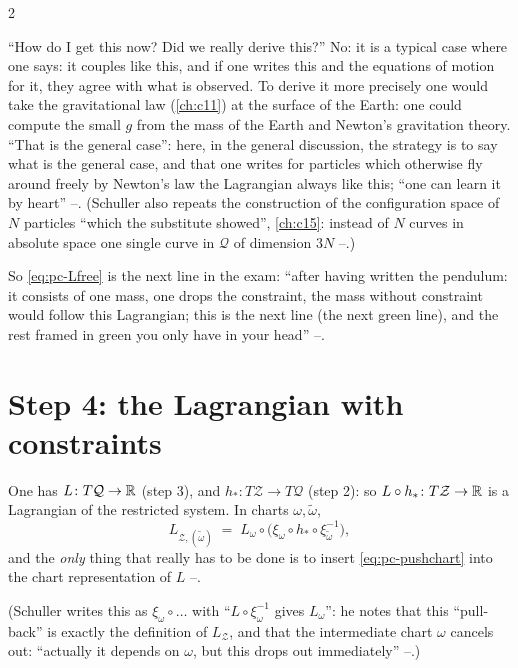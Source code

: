 \begin{paracol}{2}
\begin{coursenote}[Where does $V=mgq^3$ come from? (as said in class)]\label{cn:pc-mgh}
``How do I get this now? Did we really derive this?'' No: it is a typical case where one says: it couples like this, and if one writes this and the equations of motion for it, they agree with what is observed. To derive it more precisely one would take the gravitational law (\cref{ch:c11}) at the surface of the Earth: one could compute the small $g$ from the mass of the Earth and Newton's gravitation theory. ``That is the general case'': here, in the general discussion, the strategy is to say what is the general case, and that one writes for particles which otherwise fly around freely by Newton's law the Lagrangian always like this; ``one can learn it by heart'' --. (Schuller also repeats the construction of the configuration space of $N$ particles ``which the substitute showed'', \cref{ch:c15}: instead of $N$ curves in absolute space one single curve in $\mathcal Q$ of dimension $3N$ --.)
\end{coursenote}

So \eqref{eq:pc-Lfree} is the next line in the exam: ``after having written the pendulum: it consists of one mass, one drops the constraint, the mass without constraint would follow this Lagrangian; this is the next line (the next green line), and the rest framed in green you only have in your head'' --.

\section{Step 4: the Lagrangian with constraints}\label{sec:pc-step4}

\begin{recall}[$L_{\mathcal Z}=L\circ h_*$ (\cref{ch:c16}, \eqref{eq:zw-LZ})]\label{rec:pc-step4}
One has $L\colon T\mathcal Q\to\mathbb{R}$ (step 3), and $h_*\colon T\mathcal Z\to T\mathcal Q$ (step 2): so $L\circ h_*\colon T\mathcal Z\to\mathbb{R}$ is a Lagrangian of the restricted system. In charts $\omega,\tilde\omega$,
\[
  L_{\mathcal Z,(\tilde\omega)}\;=\;L_{\omega}\circ\bigl(\xi_\omega\circ h_*\circ\xi_{\tilde\omega}^{-1}\bigr),
\]
and the \emph{only} thing that really has to be done is to insert \eqref{eq:pc-pushchart} into the chart representation of $L$ --.
\end{recall}
(Schuller writes this as $\xi_\omega\circ\dots$ with ``$L\circ\xi_\omega^{-1}$ gives $L_\omega$'': he notes that this ``pull-back'' is exactly the definition of $L_{\mathcal Z}$, and that the intermediate chart $\omega$ cancels out: ``actually it depends on $\omega$, but this drops out immediately'' --.)


\end{paracol}
